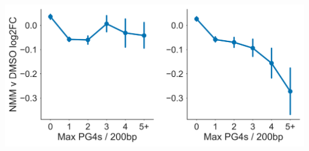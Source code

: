 \documentclass[12pt,a4paper,]{report}
\let\origfigure=\figure
\let\endorigfigure=\endfigure
\renewenvironment{figure}[1][2] {
    \expandafter\origfigure\expandafter[H]
} {
    \endorigfigure
}
\begin{document}
\begin{figure}[htbp]
\centering
\includegraphics[width=\textwidth,height=562pt,keepaspectratio]{chapter_5/figures/nmm_exprs_g4_max_density.png}
\caption[NMM regulates genes with large maximal PG4 density]{\textbf{NMM   regulates   genes   with   large   maximal   PG4   density}   Point   plot   showing   mean   log   fold   change   in   gene   expression   during   NMM   treatment   for   genes   binned   by   " maximal   PG4   density ,   defined   as   the   greatest   concentration   of   PG4   motifs   within   a   200bp   sliding   window   anywhere   in   the   body   of   the   gene   (i.e. exon   or   intron).   Left   and   right   panels   depict   coding   and   template   strands,   respectively.   Errorbars   are   68\%   confidence   intervals   for   mean   generated   using   1000   bootstrapped   samples.   \label{max_g4}}
\end{figure}
\end{document}
